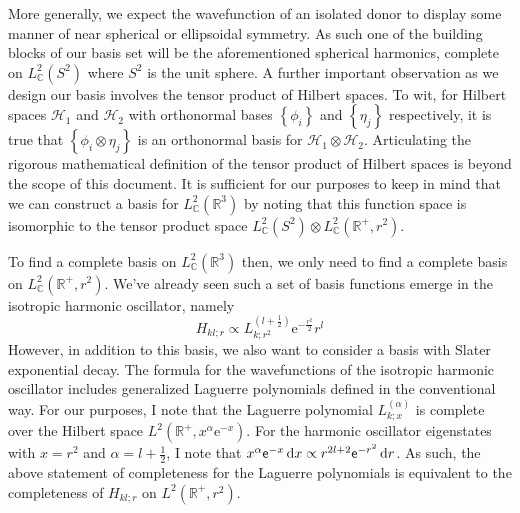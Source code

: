 More generally, we expect the wavefunction of an isolated donor to display some
manner of near spherical or ellipsoidal symmetry. As such one of the building
blocks of our basis set will be the aforementioned spherical harmonics, complete
on $L^{2}_{\mathbb{C}}\left(S^{2}\right)$ where $S^{2}$ is the unit sphere. A
further important observation as we design our basis involves the tensor product
of Hilbert spaces. To wit, for Hilbert spaces $\mathcal{H}_{1}$ and
$\mathcal{H}_{2}$ with orthonormal bases $\left\{\phi_{i}\right\}$ and
$\left\{\eta_{j}\right\}$ respectively, it is true that
$\left\{\phi_{i}\otimes\eta_{j}\right\}$ is an orthonormal basis for
$\mathcal{H}_{1}\otimes\mathcal{H}_{2}$. Articulating the rigorous mathematical
definition of the tensor product of Hilbert spaces is beyond the scope of this
document. It is sufficient for our purposes to keep in mind that we can
construct a basis for $L^{2}_{\mathbb{C}}\left(\mathbb{R}^{3}\right)$ by noting
that this function space is isomorphic to the tensor product space
$L^{2}_{\mathbb{C}}\left(S^{2}\right)
\otimes
L^{2}_{\mathbb{C}}\left(\mathbb{R}^{+},r^2\right)$.


To find a complete basis on $L^{2}_{\mathbb{C}}\left(\mathbb{R}^{3}\right)$
then, we only need to find a complete basis on
$L^{2}_{\mathbb{C}}\left(\mathbb{R}^{+},r^2\right)$. We've already seen such a
set of basis functions emerge in the isotropic harmonic oscillator, namely  
\begin{equation}
  H_{kl;r}
  \propto
  L_{k;r^{2}}^{\left(l+\frac{1}{2}\right)}
  \mathrm{e}^{-\frac{r^2}{2}}
  r^{l}
\end{equation}
However, in addition to this basis, we also want to consider a basis with Slater
exponential decay. The formula for the wavefunctions of the isotropic harmonic
oscillator includes generalized Laguerre polynomials defined in the conventional
way\cite{LaguerrePolynomials}. For our purposes, I note that the Laguerre
polynomial $L_{k;x}^{\left(\alpha\right)}$ is complete over the Hilbert space
$L^{2}\left(\mathbb{R}^{+},x^\alpha\mathrm{e}^{-x}\right)$. For the harmonic
oscillator eigenstates with $x = r^{2}$ and $\alpha = l + \frac{1}{2}$, I note
that $x^{\alpha}\mathsf{e}^{-x}\,\mathrm{d}{x} \propto r^{2l+2}\mathsf{e}^{-r^{2}}\,\mathrm{d}{r}$. As
such, the above statement of completeness for the Laguerre polynomials is
equivalent to the completeness of $H_{kl;r}$ on
$L^{2}\left(\mathbb{R}^{+},r^{2}\right)$. 

